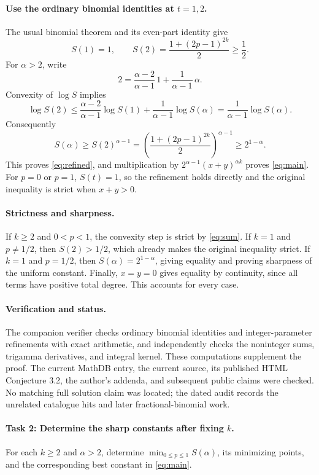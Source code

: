 \documentclass[11pt]{article}
\begin{document}
\paragraph{Use the ordinary binomial identities at \(t=1,2\).}
The usual binomial theorem and its even-part identity give
\begin{equation}\label{eq:anchors}
 S(1)=1,\qquad
 S(2)=\frac{1+(2p-1)^{2k}}2\geq\frac12.
\end{equation}
For \(\alpha>2\), write
\[
 2=\frac{\alpha-2}{\alpha-1}\,1+
                       \frac1{\alpha-1}\,\alpha.
\]
Convexity of \(\log S\) implies
\[
 \log S(2)\leq
 \frac{\alpha-2}{\alpha-1}\log S(1)
 +\frac1{\alpha-1}\log S(\alpha)
 =\frac1{\alpha-1}\log S(\alpha).
\]
Consequently
\[
 S(\alpha)\geq S(2)^{\alpha-1}
 =\left(\frac{1+(2p-1)^{2k}}2\right)^{\alpha-1}
 \geq2^{1-\alpha}.
\]
This proves \eqref{eq:refined}, and multiplication by
\(2^{\alpha-1}(x+y)^{\alpha k}\) proves \eqref{eq:main}.
For \(p=0\) or \(p=1\), \(S(t)=1\), so the refinement holds directly
and the original inequality is strict when \(x+y>0\).

\paragraph{Strictness and sharpness.}
If \(k\geq2\) and \(0<p<1\), the convexity step is strict by
\eqref{eq:sum}. If \(k=1\) and \(p\ne1/2\), then \(S(2)>1/2\),
which already makes the original inequality strict.
If \(k=1\) and \(p=1/2\), then \(S(\alpha)=2^{1-\alpha}\), giving
equality and proving sharpness of the uniform constant.
Finally, \(x=y=0\) gives equality by continuity, since all terms
have positive total degree. This accounts for every case.

\paragraph{Verification and status.}
The companion verifier checks ordinary binomial identities and
integer-parameter refinements with exact arithmetic, and independently
checks the noninteger sums, trigamma derivatives, and integral kernel.
These computations supplement the proof.
The current MathDB entry, the current source, its published HTML
Conjecture 3.2, the author's addenda, and subsequent public claims were
checked. No matching full solution claim was located; the dated audit
records the unrelated catalogue hits and later fractional-binomial work.

\paragraph{Task 2: Determine the sharp constants after fixing \(k\).}
For each \(k\geq2\) and \(\alpha>2\), determine
\(\min_{0\leq p\leq1}S(\alpha)\), its minimizing points, and the
corresponding best constant in \eqref{eq:main}.
\end{document}

